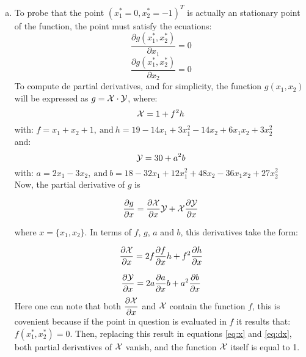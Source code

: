 \documentclass[18pt,a4paper]{article}
\begin{document}
\begin{enumerate}[a)]
		\item To probe that the point $(x_1^{*} = 0, x_2^{*} = -1)^T$ is actually an stationary point of the function, the point must satisfy the ecuations:
			\begin{equation} \label{eq:parcial1}
				\dfrac{\partial g(x_1^{*},x_2^{*})}{\partial x_1} = 0
			\end{equation}
			\begin{equation} \label{eq:parcial2}	
				\dfrac{\partial g(x_1^{*},x_2^{*})}{\partial x_2} = 0
			\end{equation}
			To compute de partial derivatives, and for simplicity, the function $g(x_1,x_2)$ will be expressed as $g = \cal X \cdot \cal Y$, where:
			\begin{equation}\label{eq:x}
				{\cal X} = 1 + f^{2}h
			\end{equation}
			with: $f = x_1 + x_2 + 1, \>\text{and}\> h = 19 - 14x_1 + 3x_1^2 - 14x_2 + 6x_1x_2 + 3x_2^2 $\\
			
			and:
			\begin{equation}\label{eq:y}
				{\cal Y} = 30 + a^2b
			\end{equation}
			with: $a = 2x_1 - 3x_2, \>\text{and}\> b = 18 - 32x_1 + 12x_1^2 + 48x_2 - 36x_1x_2 + 27x_2^2 $\\
			
			Now, the partial derivative of $g$ is 
			
			\begin{equation}\label{eq:dg}
				\dfrac{\partial g}{\partial x} = \dfrac{\partial{\cal X}}{\partial x} {\cal Y} + {\cal X}\dfrac{\partial{\cal Y}}{\partial x}
			\end{equation} 
			
			where $x = \{x_1,x_2\}$. In terms of $f$, $g$, $a$ and $b$, this derivatives take the form: 

			\begin{equation}\label{eq:dx}
				\dfrac{\partial{\cal X}}{\partial x} = 2f\dfrac{\partial f}{\partial x}h + f^2\dfrac{\partial h}{\partial x}
			\end{equation}
			
			\begin{equation}\label{eq:dy}
				\dfrac{\partial{\cal Y}}{\partial x} = 2a\dfrac{\partial a}{\partial x}b + a^2\dfrac{\partial b}{\partial x}
			\end{equation}
			Here one can note that both $\dfrac{\partial{\cal X}}{\partial x}$ and $\cal X$ contain the function $f$, this is covenient because if the point in question is evaluated in $f$ it results that: $f(x_1^{*},x_2^{*}) = 0$. Then, replacing this result in equations \eqref{eq:x} and \eqref{eq:dx}, both partial derivatives of $\cal X$ vanish, and the function $\cal X$ itself is equal to 1.
			

\end{enumerate}
\end{document}
